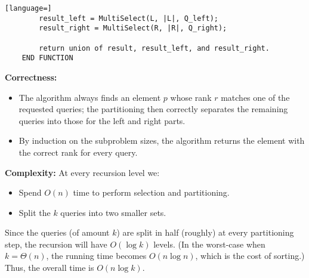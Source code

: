 \documentclass[letterpaper, 11pt]{article}
\newcommand{\1}{\mathds{1}}	%
\theoremstyle{definition}
\newenvironment{solution}{{\par\noindent\it Solution.}}{}
\begin{document}
\begin{solution}
\begin{lstlisting}[language=]
        result_left = MultiSelect(L, |L|, Q_left);
        result_right = MultiSelect(R, |R|, Q_right);
        
        return union of result, result_left, and result_right.
    END FUNCTION
    \end{lstlisting}
    
    \bigskip
    \textbf{Correctness:}  
    \begin{itemize}[leftmargin=2cm]
        \item The algorithm always finds an element \(p\) whose rank \(r\) matches one of the requested queries; the partitioning then correctly separates the remaining queries into those for the left and right parts.
        \item By induction on the subproblem sizes, the algorithm returns the element with the correct rank for every query.
    \end{itemize}
    
    \bigskip
    \textbf{Complexity:}  
    At every recursion level we:
    \begin{itemize}[leftmargin=2cm]
        \item Spend \(O(n)\) time to perform selection and partitioning.
        \item Split the \(k\) queries into two smaller sets.
    \end{itemize}
    
    Since the queries (of amount \(k\)) are split in half (roughly) at every partitioning step, the recursion will have \(O(\log k)\) levels. (In the worst-case when \(k=\Theta(n)\), the running time becomes \(O(n \log n)\), which is the cost of sorting.)
    Thus, the overall time is
    \(
    O(n\log k).
    \)
 \end{solution}
\end{document}
